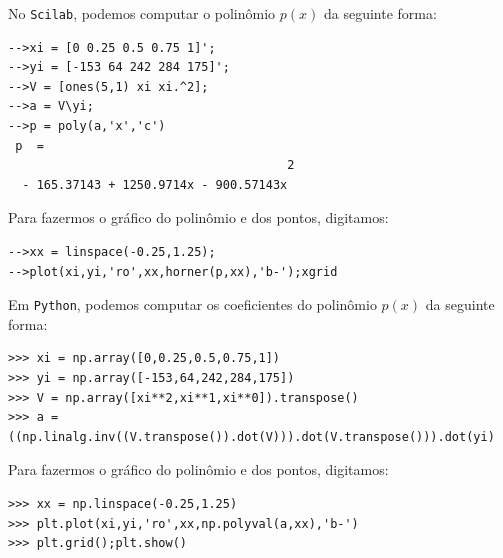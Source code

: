 \begin{sol}
\ifisscilab
No \verb+Scilab+, podemos computar o polinômio $p(x)$ da seguinte forma:
\begin{verbatim}
-->xi = [0 0.25 0.5 0.75 1]';
-->yi = [-153 64 242 284 175]';
-->V = [ones(5,1) xi xi.^2];
-->a = V\yi;
-->p = poly(a,'x','c') 
 p  =
                                       2  
  - 165.37143 + 1250.9714x - 900.57143x   
\end{verbatim}
Para fazermos o gráfico do polinômio e dos pontos, digitamos:
\begin{verbatim}
-->xx = linspace(-0.25,1.25); 
-->plot(xi,yi,'ro',xx,horner(p,xx),'b-');xgrid
\end{verbatim}
\fi
\ifispython
Em \verb+Python+, podemos computar os coeficientes do polinômio $p(x)$ da seguinte forma:
\begin{verbatim}
>>> xi = np.array([0,0.25,0.5,0.75,1])
>>> yi = np.array([-153,64,242,284,175])
>>> V = np.array([xi**2,xi**1,xi**0]).transpose()
>>> a = ((np.linalg.inv((V.transpose()).dot(V))).dot(V.transpose())).dot(yi)
\end{verbatim}
Para fazermos o gráfico do polinômio e dos pontos, digitamos:
\begin{verbatim}
>>> xx = np.linspace(-0.25,1.25)
>>> plt.plot(xi,yi,'ro',xx,np.polyval(a,xx),'b-')
>>> plt.grid();plt.show()
\end{verbatim}
\fi
\end{sol}


